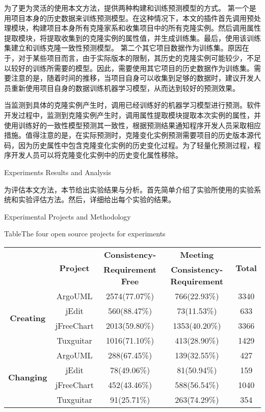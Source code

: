 {为了更为灵活的使用本文方法，提供两种构建和训练预测模型的方式。
第一个是用项目本身的历史数据来训练预测模型。在这种情况下，本文的插件首先调用预处理模块，构建项目本身所有克隆家系和收集项目中的所有克隆实例。然后调用属性提取模块，将提取收集到的克隆实例的属性值，并生成训练集。最后，使用该训练集建立和训练克隆一致性预测模型。
第二个其它项目数据作为训练集。原因在于，对于某些项目而言，由于实际版本的限制，其历史的克隆实例可能较少，不足以较好的训练所需要的模型。因此，需要使用其它项目的历史数据作为训练集。需要注意的是，随着时间的推移，当项目自身可以收集到足够的数据时，建议开发人员重新使用项目自身的数据训练机器学习模型，从而达到较好的预测效果。

当监测到具体的克隆实例产生时，调用已经训练好的机器学习模型进行预测。软件开发过程中，监测到克隆实例产生时，调用属性提取模块提取本次实例的属性，并使用训练好的一致性模型预测其一致性，根据预测结果通知程序开发人员采取相应措施。值得注意的是，在实际预测时，克隆变化实例预测需要项目的历史版本源代码，因为历史属性中包含克隆变化实例的历史变化过程。为了轻量化预测过程，程序开发人员可以将克隆变化实例中的历史变化属性移除。


{Experiments Results and Analysis}


为评估本文方法，本节给出实验结果与分析。首先简单介绍了实验所使用的实验系统和实验评估方法。然后，详细给出每个实验的结果。


{Experimental Projects and Methodology}

\begin{table*}[ht]
{Table$\!$}{The four open source projects for experiments}
\vspace{0.5em}
\centering
\wuhao
\begin{tabular}{ccccc}
\toprule[1.5pt]
~\multirow{2}{*}{\textbf{Instances}}&\multirow{2}{*}{\textbf{Project}}&\textbf{Consistency-} &\textbf{Meeting} &\multirow{2}{*}{\textbf{Total}}\\
~&~&\textbf{Requirement Free}&\textbf{Consistency-Requirement}&~\\
\midrule[1pt]
\multirow{4}{*}{\textbf{Creating}}
&ArgoUML&	2574(77.07\%)&	766(22.93\%)&	3340\\
&jEdit&560(88.47\%)&	73(11.53\%)&	633\\
&jFreeChart&	2013(59.80\%)&	1353(40.20\%)&	3366\\
&Tuxguitar&	1016(71.10\%)&	413(28.90\%)&	1429\\
\hline
\multirow{4}{*}{\textbf{Changing}}
&ArgoUML&288(67.45\%)&139(32.55\%)&427\\
&jEdit&78(49.06\%)&81(50.94\%)&159\\
&jFreeChart&452(43.46\%)&588(56.54\%)&1040\\
&Tuxguitar&91(25.71\%)&263(74.29\%)&354\\
\bottomrule[1.5pt]
\end{tabular}
\end{table*}

}
